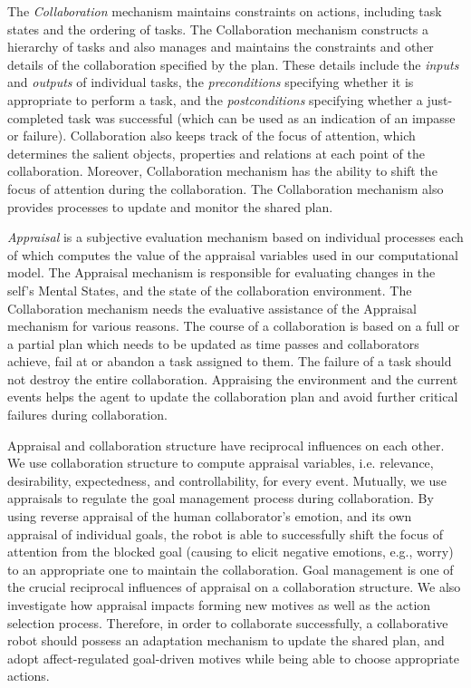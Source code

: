 \documentclass[letterpaper]{article}
\begin{document}
The \textit{Collaboration} mechanism maintains constraints on actions, including
task states and the ordering of tasks. The Collaboration mechanism constructs a
hierarchy of tasks and also manages and maintains the constraints and other
details of the collaboration specified by the plan. These details include the
\textit{inputs} and \textit{outputs} of individual tasks, the
\textit{preconditions} specifying whether it is appropriate to perform a task,
and the \textit{postconditions} specifying whether a just-completed task was
successful (which can be used as an indication of an impasse or failure).
Collaboration also keeps track of the focus of attention, which determines the
salient objects, properties and relations at each point of the collaboration.
Moreover, Collaboration mechanism has the ability to shift the focus of
attention during the collaboration. The Collaboration mechanism also provides
processes to update and monitor the shared plan.
  
\textit{Appraisal} is a subjective evaluation mechanism based on individual
processes each of which computes the value of the appraisal variables used in
our computational model. The Appraisal mechanism is responsible for evaluating
changes in the self's Mental States, and the state of the collaboration
environment. The Collaboration mechanism needs the evaluative assistance of the
Appraisal mechanism for various reasons. The course of a collaboration is based
on a full or a partial plan which needs to be updated as time passes and
collaborators achieve, fail at or abandon a task assigned to them. The failure
of a task should not destroy the entire collaboration. Appraising the
environment and the current events helps the agent to update the collaboration
plan and avoid further critical failures during collaboration. 

Appraisal and collaboration structure have reciprocal influences on each
other. We use collaboration structure to compute appraisal variables, i.e.
relevance, desirability, expectedness, and controllability, for every event.
Mutually, we use appraisals to regulate the goal management process during
collaboration. By using reverse appraisal \cite{gratch:reverse-appraisal} of the
human collaborator's emotion, and its own appraisal of individual goals, the
robot is able to successfully shift the focus of attention from the blocked goal
(causing to elicit negative emotions, e.g., worry) to an appropriate one to
maintain the collaboration. Goal management is one of the crucial reciprocal
influences of appraisal on a collaboration structure. We also investigate how
appraisal impacts forming new motives as well as the action selection process.
Therefore, in order to collaborate successfully, a collaborative robot should
possess an adaptation mechanism to update the shared plan, and adopt
affect-regulated goal-driven motives while being able to choose appropriate
actions.
\end{document}
